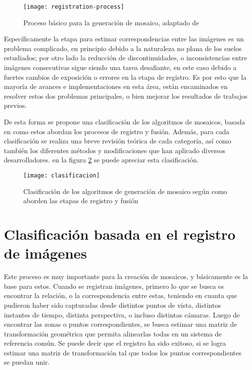 \begin{figure}[H]
	\centerline{
		\texttt{[image: registration-process]}}
	\caption[Proceso básico para la generación de mosaico]{Proceso básico para la generación de mosaico, adaptado de \cite{capel}}
	\label{imagen:mosaic-process}
\end{figure}

Específicamente la etapa para estimar correspondencias entre las imágenes es un problema complicado, en principio debido a la naturaleza no plana de los suelos estudiados; por otro lado la reducción de discontinuidades, o inconsistencias entre imágenes consecutivas sigue siendo una tarea desafiante, en este caso debido a fuertes cambios de exposición o errores en la etapa de registro. Es por esto que la mayoría de avances e implementaciones en esta área, están encaminados en resolver estos dos problemas principales, o bien mejorar los resultados de trabajos previos.

De esta forma se propone una clasificación de los algoritmos de mosaicos, basada en como estos abordan los procesos de registro y fusión. Además, para cada clasificación se realiza una breve revisión teórica de cada categoría, así como también los diferentes métodos y modificaciones que han aplicado diversos desarrolladores. en la figura \ref{imagen:clasificacion} se puede apreciar esta clasificación.

\begin{figure}[H]
	\centerline{
		\texttt{[image: clasificacion]}}
	\caption[Clasificación de los algoritmos de generación de mosaico]{Clasificación de los algoritmos de generación de mosaico según como aborden las etapas de registro y fusión}
	
	\label{imagen:clasificacion}
\end{figure}


\section*{Clasificación basada en el registro de imágenes}

Este proceso es muy importante para la creación de mosaicos, y básicamente es la base para estos. Cuando se registran imágenes, primero lo que se busca es encontrar la relación, o la correspondencia entre estas, teniendo en cuanta que pudieron haber sido capturadas desde distintos puntos de vista, distintos instantes de tiempo, distinta perspectiva, o incluso distintas cámaras. Luego de encontrar las zonas o puntos correspondientes, se busca estimar una matriz de transformación geométrica que permita alinearlas todas en un sistema de referencia común. Se puede decir que el registro ha sido exitoso, si se logra estimar una matriz de transformación tal que todos los puntos correspondientes se puedan unir.

